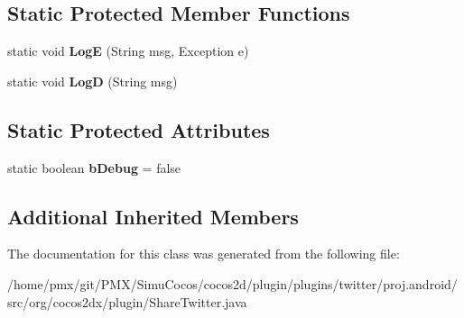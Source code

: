 \subsection*{Static Protected Member Functions}
\begin{DoxyCompactItemize}
\item 
\mbox{\label{classorg_1_1cocos2dx_1_1plugin_1_1ShareTwitter_a5de4f0827300d052d6b37eaa3396b37a}} 
static void {\bfseries LogE} (String msg, Exception e)
\item 
\mbox{\label{classorg_1_1cocos2dx_1_1plugin_1_1ShareTwitter_ae10a79f28cf0b5423499cbab72e6633b}} 
static void {\bfseries LogD} (String msg)
\end{DoxyCompactItemize}
\subsection*{Static Protected Attributes}
\begin{DoxyCompactItemize}
\item 
\mbox{\label{classorg_1_1cocos2dx_1_1plugin_1_1ShareTwitter_a038f6726b534e1258cbb2553692cdd29}} 
static boolean {\bfseries b\+Debug} = false
\end{DoxyCompactItemize}
\subsection*{Additional Inherited Members}


The documentation for this class was generated from the following file\+:\begin{DoxyCompactItemize}
\item 
/home/pmx/git/\+P\+M\+X/\+Simu\+Cocos/cocos2d/plugin/plugins/twitter/proj.\+android/src/org/cocos2dx/plugin/Share\+Twitter.\+java\end{DoxyCompactItemize}
